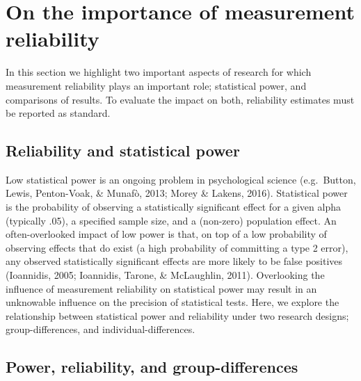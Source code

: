 \documentclass[english,,man,floatsintext]{apa6}
\begin{document}
\hypertarget{on-the-importance-of-measurement-reliability}{%
\section{On the importance of measurement reliability}\label{on-the-importance-of-measurement-reliability}}

In this section we highlight two important aspects of research for which measurement reliability plays an important role; statistical power, and comparisons of results. To evaluate the impact on both, reliability estimates must be reported as standard.

\hypertarget{reliability-and-statistical-power}{%
\subsection{Reliability and statistical power}\label{reliability-and-statistical-power}}

Low statistical power is an ongoing problem in psychological science (e.g.~Button, Lewis, Penton-Voak, \& Munafò, 2013; Morey \& Lakens, 2016). Statistical power is the probability of observing a statistically significant effect for a given alpha (typically .05), a specified sample size, and a (non-zero) population effect. An often-overlooked impact of low power is that, on top of a low probability of observing effects that do exist (a high probability of committing a type 2 error), any observed statistically significant effects are more likely to be false positives (Ioannidis, 2005; Ioannidis, Tarone, \& McLaughlin, 2011). Overlooking the influence of measurement reliability on statistical power may result in an unknowable influence on the precision of statistical tests. Here, we explore the relationship between statistical power and reliability under two research designs; group-differences, and individual-differences.

\hypertarget{power-reliability-and-group-differences}{%
\subsection{Power, reliability, and group-differences}\label{power-reliability-and-group-differences}}
\end{document}

